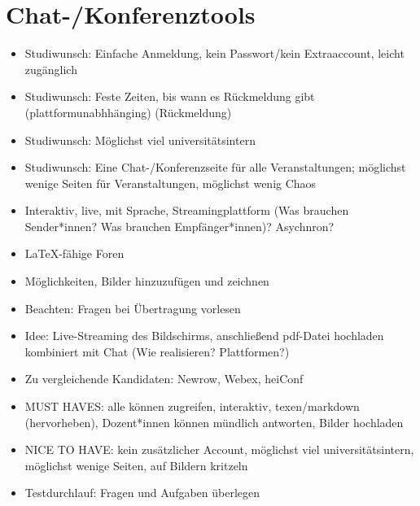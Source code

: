 \documentclass[parskip=off,index=totocnumbered]{scrreprt}
\begin{document}
\chapter{Chat-/Konferenztools}
   \begin{itemize}
      \item Studiwunsch: Einfache Anmeldung, kein Passwort/kein Extraaccount, leicht zugänglich
      \item Studiwunsch: Feste Zeiten, bis wann es Rückmeldung gibt (plattformunabhhänging) (Rückmeldung)
      \item Studiwunsch: Möglichst viel universitätsintern
      \item Studiwunsch: Eine Chat-/Konferenzseite für alle Veranstaltungen; möglichst wenige Seiten für Veranstaltungen, möglichst wenig Chaos
      \item Interaktiv, live, mit Sprache, Streamingplattform (Was brauchen Sender*innen? Was brauchen Empfänger*innen)? Asychnron?
      \item \LaTeX-fähige Foren
      \item Möglichkeiten, Bilder hinzuzufügen und zeichnen
      \item Beachten: Fragen bei Übertragung vorlesen
      \item Idee: Live-Streaming des Bildschirms, anschließend pdf-Datei hochladen kombiniert mit Chat (Wie realisieren? Plattformen?)
      \item Zu vergleichende Kandidaten: Newrow, Webex, heiConf
      \item MUST HAVES: alle können zugreifen, interaktiv, texen/markdown (hervorheben), Dozent*innen können mündlich antworten, Bilder hochladen
      \item NICE TO HAVE: kein zusätzlicher Account, möglichst viel universitätsintern, möglichst wenige Seiten, auf Bildern kritzeln
      \item Testdurchlauf: Fragen und Aufgaben überlegen
   \end{itemize}
\end{document}
